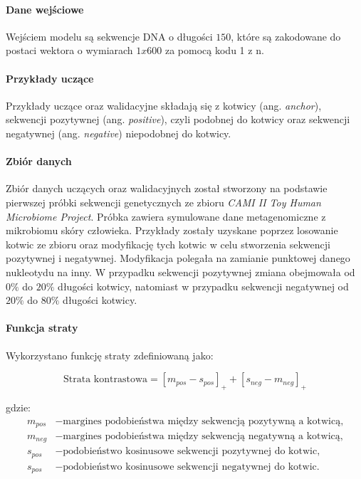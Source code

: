             \paragraph{Dane wejściowe}
                Wejściem modelu są sekwencje DNA o długości $150$, które są zakodowane do postaci wektora o wymiarach $1x600$ za pomocą kodu 1 z n\cite{HarrisDavid:2007}.

            \paragraph{Przykłady uczące}
                Przykłady uczące oraz walidacyjne składają się z kotwicy (ang. \textit{anchor}), sekwencji pozytywnej (ang. \textit{positive}), czyli podobnej do kotwicy oraz sekwencji negatywnej (ang. \textit{negative}) niepodobnej do kotwicy.

            \paragraph{Zbiór danych}
                Zbiór danych uczących oraz walidacyjnych został stworzony na podstawie pierwszej próbki sekwencji genetycznych ze zbioru \textit{CAMI II Toy Human Microbiome Project}\cite{Fritz:2019}. Próbka zawiera symulowane dane metagenomiczne z mikrobiomu skóry człowieka. Przykłady zostały uzyskane poprzez losowanie kotwic ze zbioru oraz modyfikację tych kotwic w celu stworzenia sekwencji pozytywnej i negatywnej. Modyfikacja polegała na zamianie punktowej danego nukleotydu na inny. W przypadku sekwencji pozytywnej zmiana obejmowała od $0\%$ do $20\%$ długości kotwicy, natomiast w przypadku sekwencji negatywnej od $20\%$ do $80\%$ długości kotwicy.

            \paragraph{Funkcja straty}
                Wykorzystano funkcję straty zdefiniowaną jako:

                \begin{equation}
                    \text{Strata kontrastowa} = [m_{pos} - s_{pos}]_{+} + [s_{neg} - m_{neg}]_{+}
                \end{equation}

                gdzie:
                \begin{align*}
                    m_{pos} &- \text{margines podobieństwa między sekwencją pozytywną a kotwicą,} \\
                    m_{neg} &- \text{margines podobieństwa między sekwencją negatywną a kotwicą,} \\
                    s_{pos} &- \text{podobieństwo kosinusowe sekwencji pozytywnej do kotwic,} \\
                    s_{pos} &- \text{podobieństwo kosinusowe sekwencji negatywnej do kotwic.} \\
                \end{align*}

